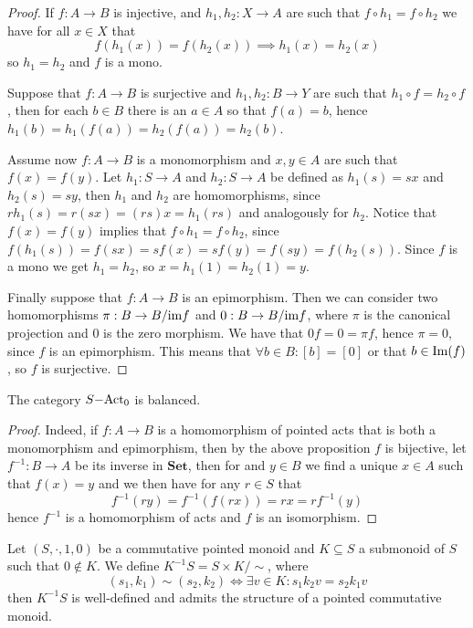 \begin{proof}
    If $f: A \to B$ is injective, and $h_1,h_2:X \to A$ are such that $f\circ h_1=f\circ h_2$ we have for all $x\in X$ that 
    \[
        f(h_1(x))=f(h_2(x)) \implies h_1(x)=h_2(x)
    \] 
    so $h_1=h_2$ and $f$ is a mono.\par
    Suppose that $f: A \to B$ is surjective and $h_1,h_2: B \to Y$ are such that $h_1\circ f = h_2\circ f$, then 
    for each $b\in B$ there is an $a\in A$ so that $f(a)=b$, hence $h_1(b)=h_1(f(a))=h_2(f(a))=h_2(b)$.\par 
    Assume now $f: A \to B$ is a monomorphism and $x,y\in A$ are such that $f(x)=f(y)$. Let $h_1: S \to A$ and $h_2: S \to A$ be defined 
    as $h_1(s) = sx$ and $h_2(s)=sy$, then $h_1$ and $h_2$ are homomorphisms, since $r h_1(s) = r(sx) = (rs)x = h_1(rs)$ and analogously for $h_2$. 
    Notice that $f(x)=f(y)$ implies that $f\circ h_1 = f\circ h_2$, since $f(h_1(s)) = f(sx) = s f(x) = s f(y) = f(sy) = f(h_2(s))$. Since $f$ is a 
    mono we get $h_1=h_2$, so $x=h_1(1)=h_2(1) = y$. \par 
    Finally suppose that $f: A \to B$ is an epimorphism. Then we can consider two homomorphisms $\pi : B \to B/\text{im}{f}$ and $0: B \to B/\text{im}{f}$, where 
    $\pi$ is the canonical projection and $0$ is the zero morphism. We have that $0 f = 0 = \pi f$, hence $\pi=0$, since $f$ is an epimorphism. 
    This means that $\forall b\in B : [b]=[0]$ or that $b\in\mathrm{Im}(f)$, so $f$ is surjective.
\end{proof}
\begin{corollary}
    The category $S\mathrm{-Act}_0$ is balanced.
\end{corollary}
\begin{proof}
    Indeed, if $f: A \to B$ is a homomorphism of pointed acts that is both a monomorphism and epimorphism, then by the above proposition 
    $f$ is bijective, let $f^{-1}: B \to A$ be its inverse in $\mathbf{Set}$, then for and $y\in B$ we find a unique $x\in A$ such that 
    $f(x)=y$ and we then have for any $r\in S$ that 
    \[
        f^{-1}(ry) = f^{-1}(f(rx))= rx = rf^{-1}(y)
    \]
    hence $f^{-1}$ is a homomorphism of acts and $f$ is an isomorphism.
\end{proof}
\begin{proposition}
    Let $(S,\cdot,1,0)$ be a commutative pointed monoid and 
    $K\subseteq S$ a submonoid of $S$ such that $0\not\in K$. 
    We define $K^{-1}S = S\times K/\sim$, where 
    \[
        (s_1,k_1)\sim(s_2,k_2)\iff \exists v\in K : s_1k_2v = s_2k_1v 
    \]
    then $K^{-1}S$ is well-defined and admits the structure of a pointed commutative monoid.
\end{proposition}
